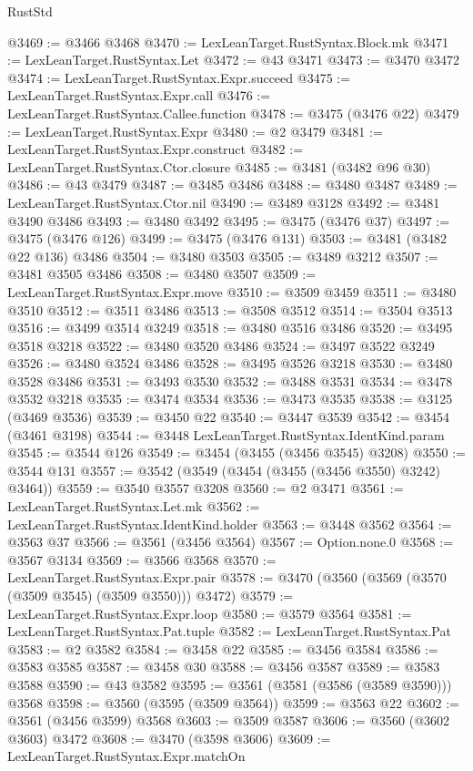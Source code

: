 \begin{lexlean}{RustStd}
\begin{coremodule}
@3469 := @3466 @3468
@3470 := LexLeanTarget.RustSyntax.Block.mk
@3471 := LexLeanTarget.RustSyntax.Let
@3472 := @43 @3471
@3473 := @3470 @3472
@3474 := LexLeanTarget.RustSyntax.Expr.succeed
@3475 := LexLeanTarget.RustSyntax.Expr.call
@3476 := LexLeanTarget.RustSyntax.Callee.function
@3478 := @3475 (@3476 @22)
@3479 := LexLeanTarget.RustSyntax.Expr
@3480 := @2 @3479
@3481 := LexLeanTarget.RustSyntax.Expr.construct
@3482 := LexLeanTarget.RustSyntax.Ctor.closure
@3485 := @3481 (@3482 @96 @30)
@3486 := @43 @3479
@3487 := @3485 @3486
@3488 := @3480 @3487
@3489 := LexLeanTarget.RustSyntax.Ctor.nil
@3490 := @3489 @3128
@3492 := @3481 @3490 @3486
@3493 := @3480 @3492
@3495 := @3475 (@3476 @37)
@3497 := @3475 (@3476 @126)
@3499 := @3475 (@3476 @131)
@3503 := @3481 (@3482 @22 @136) @3486
@3504 := @3480 @3503
@3505 := @3489 @3212
@3507 := @3481 @3505 @3486
@3508 := @3480 @3507
@3509 := LexLeanTarget.RustSyntax.Expr.move
@3510 := @3509 @3459
@3511 := @3480 @3510
@3512 := @3511 @3486
@3513 := @3508 @3512
@3514 := @3504 @3513
@3516 := @3499 @3514 @3249
@3518 := @3480 @3516 @3486
@3520 := @3495 @3518 @3218
@3522 := @3480 @3520 @3486
@3524 := @3497 @3522 @3249
@3526 := @3480 @3524 @3486
@3528 := @3495 @3526 @3218
@3530 := @3480 @3528 @3486
@3531 := @3493 @3530
@3532 := @3488 @3531
@3534 := @3478 @3532 @3218
@3535 := @3474 @3534
@3536 := @3473 @3535
@3538 := @3125 (@3469 @3536)
@3539 := @3450 @22
@3540 := @3447 @3539
@3542 := @3454 (@3461 @3198)
@3544 := @3448 LexLeanTarget.RustSyntax.IdentKind.param
@3545 := @3544 @126
@3549 := @3454 (@3455 (@3456 @3545) @3208)
@3550 := @3544 @131
@3557 := @3542 (@3549 (@3454 (@3455 (@3456 @3550) @3242) @3464))
@3559 := @3540 @3557 @3208
@3560 := @2 @3471
@3561 := LexLeanTarget.RustSyntax.Let.mk
@3562 := LexLeanTarget.RustSyntax.IdentKind.holder
@3563 := @3448 @3562
@3564 := @3563 @37
@3566 := @3561 (@3456 @3564)
@3567 := Option.none.{0}
@3568 := @3567 @3134
@3569 := @3566 @3568
@3570 := LexLeanTarget.RustSyntax.Expr.pair
@3578 := @3470 (@3560 (@3569 (@3570 (@3509 @3545) (@3509 @3550))) @3472)
@3579 := LexLeanTarget.RustSyntax.Expr.loop
@3580 := @3579 @3564
@3581 := LexLeanTarget.RustSyntax.Pat.tuple
@3582 := LexLeanTarget.RustSyntax.Pat
@3583 := @2 @3582
@3584 := @3458 @22
@3585 := @3456 @3584
@3586 := @3583 @3585
@3587 := @3458 @30
@3588 := @3456 @3587
@3589 := @3583 @3588
@3590 := @43 @3582
@3595 := @3561 (@3581 (@3586 (@3589 @3590))) @3568
@3598 := @3560 (@3595 (@3509 @3564))
@3599 := @3563 @22
@3602 := @3561 (@3456 @3599) @3568
@3603 := @3509 @3587
@3606 := @3560 (@3602 @3603) @3472
@3608 := @3470 (@3598 @3606)
@3609 := LexLeanTarget.RustSyntax.Expr.matchOn

\end{coremodule}
\end{lexlean}
